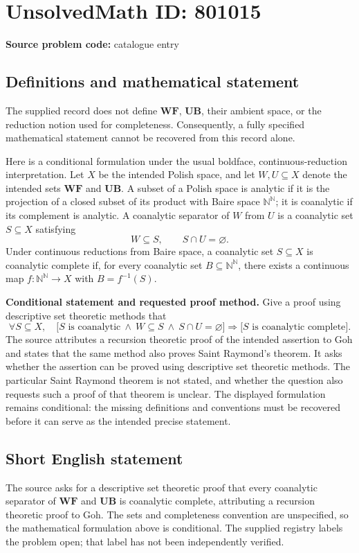 \documentclass[11pt]{article}
\newcommand{\N}{\mathbb{N}}
\begin{document}
\section*{UnsolvedMath ID: 801015}
\textbf{Source problem code:} catalogue entry
\subsection{Definitions and mathematical statement}
The supplied record does not define \(\mathbf{WF}\), \(\mathbf{UB}\), their ambient space, or the reduction notion used for completeness. Consequently, a fully specified mathematical statement cannot be recovered from this record alone.

Here is a conditional formulation under the usual boldface, continuous-reduction interpretation. Let \(X\) be the intended Polish space, and let \(W,U\subseteq X\) denote the intended sets \(\mathbf{WF}\) and \(\mathbf{UB}\). A subset of a Polish space is analytic if it is the projection of a closed subset of its product with Baire space \(\N^{\N}\); it is coanalytic if its complement is analytic. A coanalytic separator of \(W\) from \(U\) is a coanalytic set \(S\subseteq X\) satisfying
\[
W\subseteq S,\qquad S\cap U=\varnothing.
\]
Under continuous reductions from Baire space, a coanalytic set \(S\subseteq X\) is coanalytic complete if, for every coanalytic set \(B\subseteq\N^{\N}\), there exists a continuous map \(f:\N^{\N}\to X\) with \(B=f^{-1}(S)\).

\textbf{Conditional statement and requested proof method.} Give a proof using descriptive set theoretic methods that
\[
\forall S\subseteq X,\quad
\bigl[S\text{ is coanalytic}\ \land\ W\subseteq S\ \land\ S\cap U=\varnothing\bigr]
\Longrightarrow
\bigl[S\text{ is coanalytic complete}\bigr].
\]
The source attributes a recursion theoretic proof of the intended assertion to Goh and states that the same method also proves Saint Raymond's theorem. It asks whether the assertion can be proved using descriptive set theoretic methods. The particular Saint Raymond theorem is not stated, and whether the question also requests such a proof of that theorem is unclear. The displayed formulation remains conditional: the missing definitions and conventions must be recovered before it can serve as the intended precise statement.
\subsection{Short English statement}
The source asks for a descriptive set theoretic proof that every coanalytic separator of \(\mathbf{WF}\) and \(\mathbf{UB}\) is coanalytic complete, attributing a recursion theoretic proof to Goh. The sets and completeness convention are unspecified, so the mathematical formulation above is conditional. The supplied registry labels the problem open; that label has not been independently verified.
\end{document}
